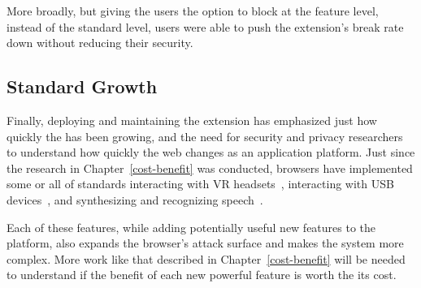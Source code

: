 More broadly, but giving the users the option to block at the feature level,
instead of the standard level, users were able to push the extension's break
rate down without reducing their security.


\subsection{\WAPI Standard Growth}
Finally, deploying and maintaining the extension has emphasized just how quickly
the \WAPI has been growing, and the need for security and privacy researchers
to understand how quickly the web changes as an application platform.  Just
since the research in Chapter~\ref{cost-benefit} was conducted, browsers have
implemented some or all of standards interacting with VR headsets~\cite{webvrstandard},
interacting with USB devices~\cite{webusbstandard}, and synthesizing and
recognizing speech~\cite{speechtandard}.

Each of these features, while adding
potentially useful new features to the platform, also expands the browser's
attack surface and makes the system more complex.  More work like that
described in Chapter~\ref{cost-benefit} will be needed to understand if
the benefit of each new powerful feature is worth the its cost.